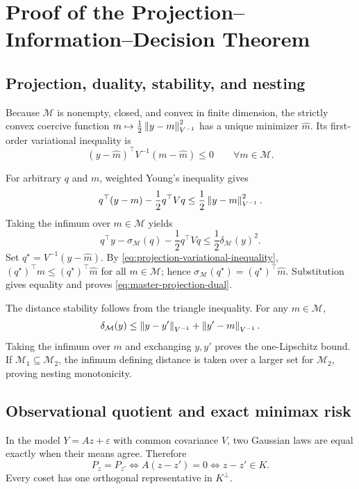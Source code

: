 \section{Proof of the Projection--Information--Decision Theorem}
\label{app:deep-theory}

\subsection{Projection, duality, stability, and nesting}

Because $\mathcal M$ is nonempty, closed, and convex in finite dimension, the
strictly convex coercive function
$m\mapsto\frac12\left\lVert y-m\right\rVert_{V^{-1}}^2$ has a unique minimizer
$\widehat m$.  Its first-order variational inequality is
\begin{equation}
(y-\widehat m)^\top V^{-1}(m-\widehat m)\le0
\qquad\forall m\in\mathcal M.
\label{eq:projection-variational-inequality}
\end{equation}

For arbitrary $q$ and $m$, weighted Young's inequality gives
\[
q^\top(y-m)-\frac12q^\top Vq
\le\frac12\left\lVert y-m\right\rVert_{V^{-1}}^2.
\]
Taking the infimum over $m\in\mathcal M$ yields
\[
q^\top y-\sigma_{\mathcal M}(q)-\frac12q^\top Vq
\le\frac12\delta_{\mathcal M}(y)^2.
\]
Set $q^\star=V^{-1}(y-\widehat m)$.  By
\cref{eq:projection-variational-inequality},
$(q^\star)^\top m\le(q^\star)^\top\widehat m$ for all $m\in\mathcal M$;
hence
$\sigma_{\mathcal M}(q^\star)=(q^\star)^\top\widehat m$.  Substitution gives
equality and proves \cref{eq:master-projection-dual}.

The distance stability follows from the triangle inequality.  For any
$m\in\mathcal M$,
\[
\delta_{\mathcal M}(y)
\le\left\lVert y-y'\right\rVert_{V^{-1}}+\left\lVert y'-m\right\rVert_{V^{-1}}.
\]
Taking the infimum over $m$ and exchanging $y,y'$ proves the one-Lipschitz
bound.  If $\mathcal M_1\subseteq\mathcal M_2$, the infimum defining distance
is taken over a larger set for $\mathcal M_2$, proving nesting monotonicity.

\subsection{Observational quotient and exact minimax risk}

In the model $Y=Az+\varepsilon$ with common covariance $V$, two Gaussian laws
are equal exactly when their means agree.  Therefore
\[
P_z=P_{z'}
\Longleftrightarrow A(z-z')=0
\Longleftrightarrow z-z'\in K.
\]
Every coset has one orthogonal representative in $K^\perp$.

